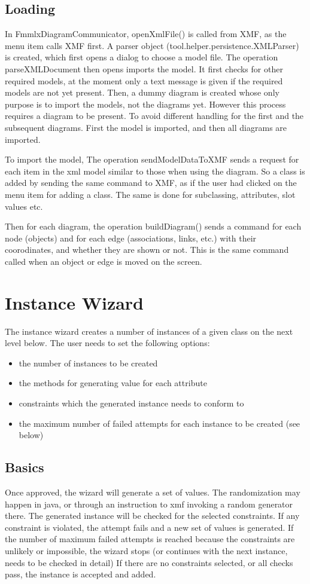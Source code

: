 \documentclass [11pt,letterpaper,twoside,openright]{book}
\begin{document}
\section{Loading}
In FmmlxDiagramCommunicator, openXmlFile() is called from XMF, as the menu item calls XMF first.
A parser object (tool.helper.persistence.XMLParser) is created, which first opens a dialog to choose a model file.
The operation parseXMLDocument then opens imports the model.
It first checks for other required models, at the moment only a text message is given if the required models are not yet present.
Then, a dummy diagram is created whose only purpose is to import the models, not the diagrams yet. However this process requires a diagram to be present. To avoid different handling for the first and the subsequent diagrams. First the model is imported, and then all diagrams are imported.

To import the model, 
The operation sendModelDataToXMF sends a request for each item in the xml model similar to those when using the diagram. So a class is added by sending the same command to XMF, as if the user had clicked on the menu item for adding a class. The same is done for subclassing, attributes, slot values etc.

Then for each diagram, the operation buildDiagram() sends a command for each node (objects) and for each edge (associations, links, etc.) with their coorodinates, and whether they are shown or not. This is the same command called when an object or edge is moved on the screen.


\chapter{Instance Wizard}
The instance wizard creates a number of instances of a given class on the next level below. 
The user needs to set the following options:

\begin{itemize}
	\item the number of instances to be created
	\item the methods for generating value for each attribute
	\item constraints which the generated instance needs to conform to
	\item the maximum number of failed attempts for each instance to be created (see below)
\end{itemize}

\section{Basics}
Once approved, the wizard will generate a set of values. The randomization may happen in java, or through an instruction to xmf invoking a random generator there. The generated instance will be checked for the selected constraints. If any constraint is violated, the attempt fails and a new set of values is generated. If the number of maximum failed attempts is reached because the constraints are unlikely or impossible, the wizard stops (or continues with the next instance, needs to be checked in detail) If there are no constraints selected, or all checks pass, the instance is accepted and added.
\end{document}

